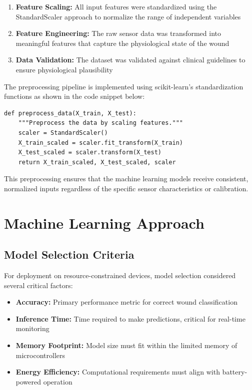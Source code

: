 \documentclass[conference]{IEEEtran}
\begin{document}
\begin{enumerate}
    \item \textbf{Feature Scaling:} All input features were standardized using the StandardScaler approach to normalize the range of independent variables
    \item \textbf{Feature Engineering:} The raw sensor data was transformed into meaningful features that capture the physiological state of the wound
    \item \textbf{Data Validation:} The dataset was validated against clinical guidelines to ensure physiological plausibility
\end{enumerate}

The preprocessing pipeline is implemented using scikit-learn's standardization functions as shown in the code snippet below:

\begin{verbatim}
def preprocess_data(X_train, X_test):
    """Preprocess the data by scaling features."""
    scaler = StandardScaler()
    X_train_scaled = scaler.fit_transform(X_train)
    X_test_scaled = scaler.transform(X_test)
    return X_train_scaled, X_test_scaled, scaler
\end{verbatim}

This preprocessing ensures that the machine learning models receive consistent, normalized inputs regardless of the specific sensor characteristics or calibration.

\section{Machine Learning Approach}
\subsection{Model Selection Criteria}
For deployment on resource-constrained devices, model selection considered several critical factors:

\begin{itemize}
    \item \textbf{Accuracy:} Primary performance metric for correct wound classification
    \item \textbf{Inference Time:} Time required to make predictions, critical for real-time monitoring
    \item \textbf{Memory Footprint:} Model size must fit within the limited memory of microcontrollers
    \item \textbf{Energy Efficiency:} Computational requirements must align with battery-powered operation
\end{itemize}
\end{document}
